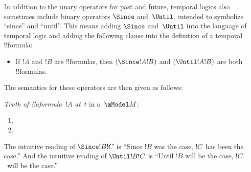 \documentclass[../../../include/open-logic-section]{subfiles}
\begin{document}


In addition to the unary operators for past and future, temporal
logics also sometimes include binary operators $\Since $ and~$\Until$,
intended to symbolize ``since'' and ``until''. This means adding
$\Since $ and~$\Until$ into the language of temporal logic and adding
the following clause into the definition of a temporal !!{formula}:

\begin{itemize}
\item[] If $!A$ and $!B$ are !!{formula}s, then $(\Since  !A !B)$ and
  $(\Until !A !B)$ are both !!{formula}s.
\end{itemize}

The semantics for these operators are then given as follows:

\begin{defn}
  \emph{Truth of !!a{formula}~$!A$ at~$t$} in a~$\mModel M$:
  \begin{enumerate}
  \item{} 
   \item{} 
  \end{enumerate} 
\end{defn}

The intuitive reading of $\Since  !B !C$ is ``Since $!B$ was the case,
$!C$~has been the case.'' And the intuitive reading of $\Until !B !C$
is ``Until $!B$ will be the case, $!C$~will be the case.''
\end{document}
